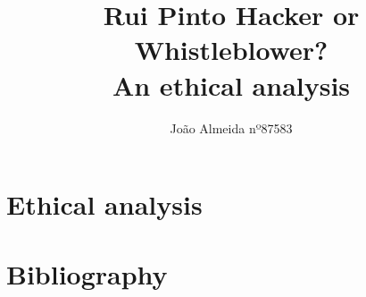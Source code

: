 \documentclass{article}
\title{Rui Pinto Hacker or Whistleblower? \\ An ethical analysis}
\author{João Almeida nº87583}
\begin{document}
\maketitle

\section{Ethical analysis}



\clearpage
\section{Bibliography}

\end{document}

